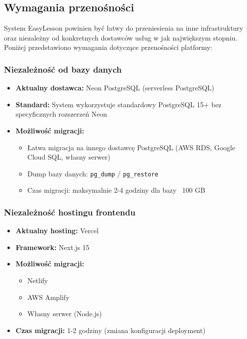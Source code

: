 \documentclass[12pt,a4paper]{article}
\begin{document}
\subsection{Wymagania przenośności}

System EasyLesson powinien być łatwy do przeniesienia na inne infrastruktury oraz niezależny od konkretnych dostawców usług w jak największym stopniu. Poniżej przedstawiono wymagania dotyczące przenośności platformy:

\subsubsection{Niezależność od bazy danych}

\begin{itemize}[leftmargin=*]
    \item \textbf{Aktualny dostawca:} Neon PostgreSQL (serverless PostgreSQL)
    \item \textbf{Standard:} System wykorzystuje standardowy PostgreSQL 15+ bez specyficznych rozszerzeń Neon
    \item \textbf{Możliwość migracji:}
    \begin{itemize}
        \item Łatwa migracja na innego dostawcę PostgreSQL (AWS RDS, Google Cloud SQL, własny serwer)
        \item Dump bazy danych: \texttt{pg\_dump} / \texttt{pg\_restore}
        \item Czas migracji: maksymalnie 2-4 godziny dla bazy ~100 GB
    \end{itemize}
    
\end{itemize}

\subsubsection{Niezależność hostingu frontendu}

\begin{itemize}[leftmargin=*]
    \item \textbf{Aktualny hosting:} Vercel
    \item \textbf{Framework:} Next.js 15
    \item \textbf{Możliwość migracji:}
    \begin{itemize}
        \item Netlify
        \item AWS Amplify 
        \item Własny serwer (Node.js)
    \end{itemize}
    \item \textbf{Czas migracji:} 1-2 godziny (zmiana konfiguracji deployment)
\end{itemize}
\end{document}
